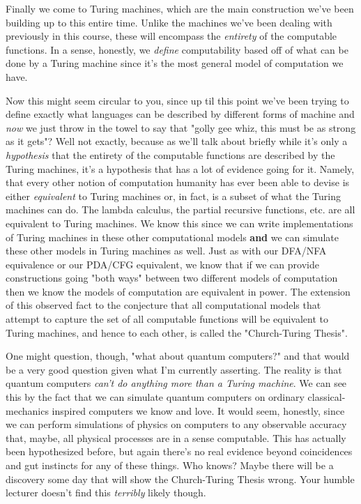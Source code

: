 \documentclass[11pt]{article}
\begin{document}
Finally we come to Turing machines, which are the main construction we've been building up to this entire time. Unlike the machines we've been dealing with previously in this course, these will encompass the \emph{entirety} of the computable functions. In a sense, honestly, we \emph{define} computability based off of what can be done by a Turing machine since it's the most general model of computation we have. 

Now this might seem circular to you, since up til this point we've been trying to define exactly what languages can be described by different forms of machine and \emph{now} we just throw in the towel to say that "golly gee whiz, this must be as strong as it gets"? Well not exactly, because as we'll talk about briefly while it's only a \emph{hypothesis} that the entirety of the computable functions are described by the Turing machines, it's a hypothesis that has a lot of evidence going for it. Namely, that every other notion of computation humanity has ever been able to devise is either \emph{equivalent} to Turing machines or, in fact, is a subset of what the Turing machines can do. The lambda calculus, the partial recursive functions, etc. are all equivalent to Turing machines. We know this since we can write implementations of Turing machines in these other computational models \textbf{and} we can simulate these other models in Turing machines as well. Just as with our DFA/NFA equivalence or our PDA/CFG equivalent, we know that if we can provide constructions going "both ways" between two different models of computation then we know the models of computation are equivalent in power. The extension of this observed fact to the conjecture that all computational models that attempt to capture the set of all computable functions will be equivalent to Turing machines, and hence to each other, is called the "Church-Turing Thesis".

One might question, though, "what about quantum computers?" and that would be a very good question given what I'm currently asserting. The reality is that quantum computers \emph{can't do anything more than a Turing machine}. We can see this by the fact that we can simulate quantum computers on ordinary classical-mechanics inspired computers we know and love. It would seem, honestly, since we can perform simulations of physics on computers to any observable accuracy that, maybe, all physical processes are in a sense computable. This has actually been hypothesized before, but again there's no real evidence beyond coincidences and gut instincts for any of these things. Who knows? Maybe there will be a discovery some day that will show the Church-Turing Thesis wrong. Your humble lecturer doesn't find this \emph{terribly} likely though. 
\end{document}
